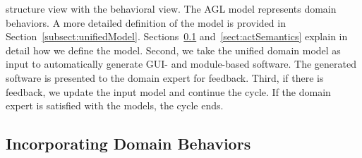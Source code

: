 \noindent structure view with the behavioral view. The AGL model represents domain behaviors. A more detailed definition of the \dcsl model is provided in Section~\ref{subsect:unifiedModel}. Sections~\ref{subsect:domainBehaviors} and~\ref{sect:actSemantics} explain in detail how we define the \agl model.
%
Second, we take the unified domain model as input to automatically generate GUI- and module-based software. The generated software is presented to the domain expert for feedback.
%
Third, if there is feedback, we update the input model and continue the cycle. If the domain expert is satisfied with the models, the cycle ends.

\subsection{Incorporating Domain Behaviors} 
\label{subsect:domainBehaviors}

